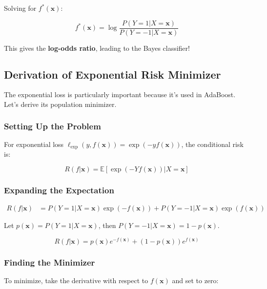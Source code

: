 \documentclass[12pt,a4paper]{article}
\begin{document}
Solving for $f^*(\mathbf{x})$:

\begin{equation}
\boxed{f^*(\mathbf{x}) = \log \frac{P(Y = 1|X = \mathbf{x})}{P(Y = -1|X = \mathbf{x})}}
\end{equation}

This gives the \textbf{log-odds ratio}, leading to the Bayes classifier!

\subsection{Derivation of Exponential Risk Minimizer}

The exponential loss is particularly important because it's used in AdaBoost. Let's derive its population minimizer.

\subsubsection{Setting Up the Problem}

For exponential loss $\ell_{\text{exp}}(y, f(\mathbf{x})) = \exp(-yf(\mathbf{x}))$, the conditional risk is:

\begin{equation}
R(f|\mathbf{x}) = \mathbb{E}[\exp(-Yf(\mathbf{x})) | X = \mathbf{x}]
\end{equation}

\subsubsection{Expanding the Expectation}

\begin{align}
R(f|\mathbf{x}) &= P(Y = 1|X = \mathbf{x}) \exp(-f(\mathbf{x})) + P(Y = -1|X = \mathbf{x}) \exp(f(\mathbf{x}))
\end{align}

Let $p(\mathbf{x}) = P(Y = 1|X = \mathbf{x})$, then $P(Y = -1|X = \mathbf{x}) = 1 - p(\mathbf{x})$.

\begin{equation}
R(f|\mathbf{x}) = p(\mathbf{x}) e^{-f(\mathbf{x})} + (1-p(\mathbf{x})) e^{f(\mathbf{x})}
\end{equation}

\subsubsection{Finding the Minimizer}

To minimize, take the derivative with respect to $f(\mathbf{x})$ and set to zero:
\end{document}
